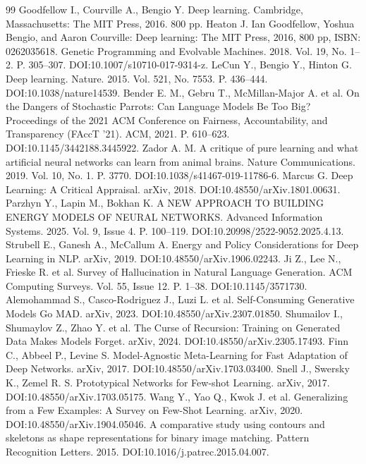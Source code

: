 \documentclass[conference]{IEEEtran}
\begin{document}
\begin{thebibliography}{99}
 Goodfellow I., Courville A., Bengio Y. Deep learning. Cambridge, Massachusetts: The MIT Press, 2016. 800 pp.
 Heaton J. Ian Goodfellow, Yoshua Bengio, and Aaron Courville: Deep learning: The MIT Press, 2016, 800 pp, ISBN: 0262035618. Genetic Programming and Evolvable Machines. 2018. Vol. 19, No. 1--2. P. 305--307. DOI:10.1007/s10710-017-9314-z.
 LeCun Y., Bengio Y., Hinton G. Deep learning. Nature. 2015. Vol. 521, No. 7553. P. 436--444. DOI:10.1038/nature14539.
 Bender E. M., Gebru T., McMillan-Major A. et al. On the Dangers of Stochastic Parrots: Can Language Models Be Too Big? Proceedings of the 2021 ACM Conference on Fairness, Accountability, and Transparency (FAccT ’21). ACM, 2021. P. 610--623. DOI:10.1145/3442188.3445922.
 Zador A. M. A critique of pure learning and what artificial neural networks can learn from animal brains. Nature Communications. 2019. Vol. 10, No. 1. P. 3770. DOI:10.1038/s41467-019-11786-6.
 Marcus G. Deep Learning: A Critical Appraisal. arXiv, 2018. DOI:10.48550/arXiv.1801.00631.
 Parzhyn Y., Lapin M., Bokhan K. A NEW APPROACH TO BUILDING ENERGY MODELS OF NEURAL NETWORKS. Advanced Information Systems. 2025. Vol. 9, Issue 4. P. 100--119. DOI:10.20998/2522-9052.2025.4.13.
 Strubell E., Ganesh A., McCallum A. Energy and Policy Considerations for Deep Learning in NLP. arXiv, 2019. DOI:10.48550/arXiv.1906.02243.
 Ji Z., Lee N., Frieske R. et al. Survey of Hallucination in Natural Language Generation. ACM Computing Surveys. Vol. 55, Issue 12. P. 1--38. DOI:10.1145/3571730.
 Alemohammad S., Casco-Rodriguez J., Luzi L. et al. Self-Consuming Generative Models Go MAD. arXiv, 2023. DOI:10.48550/arXiv.2307.01850.
 Shumailov I., Shumaylov Z., Zhao Y. et al. The Curse of Recursion: Training on Generated Data Makes Models Forget. arXiv, 2024. DOI:10.48550/arXiv.2305.17493.
 Finn C., Abbeel P., Levine S. Model-Agnostic Meta-Learning for Fast Adaptation of Deep Networks. arXiv, 2017. DOI:10.48550/arXiv.1703.03400.
 Snell J., Swersky K., Zemel R. S. Prototypical Networks for Few-shot Learning. arXiv, 2017. DOI:10.48550/arXiv.1703.05175.
 Wang Y., Yao Q., Kwok J. et al. Generalizing from a Few Examples: A Survey on Few-Shot Learning. arXiv, 2020. DOI:10.48550/arXiv.1904.05046.
 A comparative study using contours and skeletons as shape representations for binary image matching. Pattern Recognition Letters. 2015. DOI:10.1016/j.patrec.2015.04.007.

\end{thebibliography}
\end{document}
